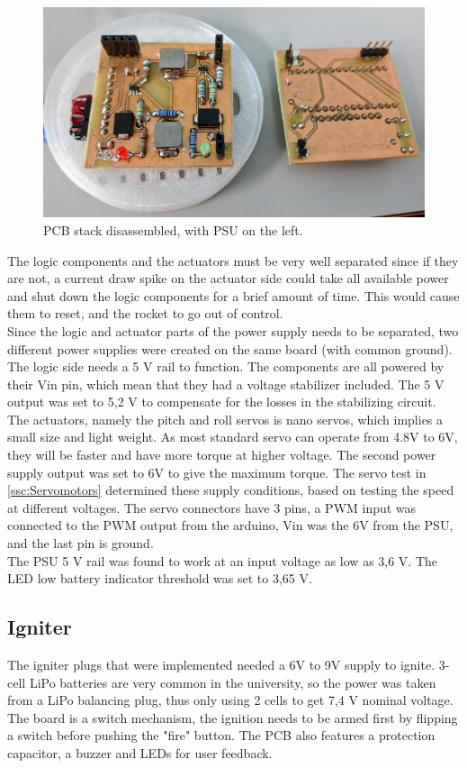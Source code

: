 \begin{figure} [h]
	\centering
	\includegraphics[width=0.7\linewidth]{figures/Rocket/implementation/psu_board.jpg}
	\caption{PCB stack disassembled, with PSU on the left.}
	\label{fig:PSU_board}
\end{figure}

The logic components and the actuators must be very well separated since if they are not, a current draw spike on the actuator side could take all available power and shut down the logic components for a brief amount of time. This would cause them to reset, and the rocket to go out of control. \\
Since the logic and actuator parts of the power supply needs to be separated, two different power supplies were created on the same board (with common ground). \\
The logic side needs a 5 V rail to function. The components are all powered by their Vin pin, which mean that they had a voltage stabilizer included. The 5 V output was set to 5,2 V to compensate for the losses in the stabilizing circuit. \\
The actuators, namely the pitch and roll servos is nano servos, which implies a small size and light weight. As most standard servo can operate from 4.8V to 6V, they will be faster and have more torque at higher voltage. The second power supply output was set to 6V to give the maximum torque. The servo test in \autoref{ssc:Servomotors} determined these supply conditions, based on testing the speed at different voltages. The servo connectors have 3 pins, a PWM input was connected to the PWM output from the arduino, Vin was the 6V from the PSU, and the last pin is ground. \\
The PSU 5 V rail was found to work at an input voltage as low as 3,6 V. The LED low battery indicator threshold was set to 3,65 V.

\subsection{Igniter}
The igniter plugs that were implemented needed a 6V to 9V supply to ignite. 3-cell LiPo batteries are very common in the university, so the power was taken from a LiPo balancing plug, thus only using 2 cells to get 7,4 V nominal voltage. The board is a switch mechanism, the ignition needs to be armed first by flipping a switch before pushing the "fire" button. The PCB also features a protection capacitor, a buzzer and LEDs for user feedback.

